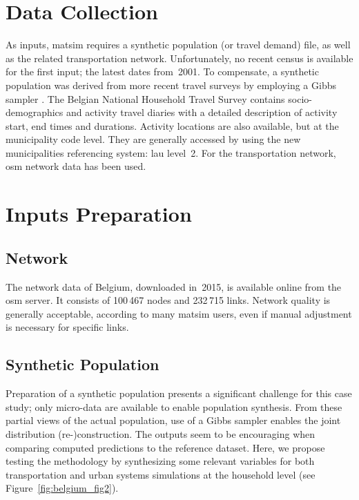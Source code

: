 \section{Data Collection}
As inputs, \gls{matsim} requires a synthetic population (or travel demand) file, as well as the related transportation network. 
Unfortunately, no recent census is available for the first input; 
the latest dates from~2001. 
To compensate, a synthetic population was derived from more recent travel surveys \citep[e.g.,][]{CornelisEtAl_ResRep_BELDAM_2012} by employing a Gibbs sampler \citep[][]{FarooqBierlaireHurtubiaEtAl2013Simulationbasedpopulation}. 
The Belgian National Household Travel Survey \citep[e.g.,][]{CornelisEtAl_ResRep_BELDAM_2012} contains socio-demographics and activity travel diaries with a detailed description of activity start, end times and durations. 
Activity locations are also available, but at the municipality code level. They are generally accessed by using the new municipalities referencing system: \gls{lau} level~2. 
For the transportation network, \gls{osm} network data has been used.

\section{Inputs Preparation}
\subsection{Network}
The network data of Belgium, downloaded in~2015, is available online from the \gls{osm} server. 
It consists of 100\,467 nodes and 232\,715 links. 
Network quality is generally acceptable, according to many \gls{matsim} users, even if manual adjustment is necessary for specific links.

\subsection{Synthetic Population}
Preparation of a synthetic population presents a significant challenge for this case study; 
only micro-data are available to enable population synthesis. 
From these partial views of the actual population, use of a Gibbs sampler enables the joint distribution (re-)construction. 
The outputs seem to be encouraging when comparing computed predictions to the reference dataset. 
Here, we propose testing the methodology by synthesizing some relevant variables for both transportation and urban systems simulations at the household level (see Figure~\ref{fig:belgium_fig2}).

